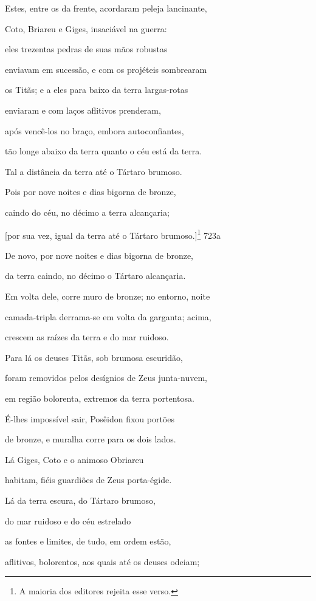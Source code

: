 \begin{pages}
\begin{Rightside}
Estes, entre os da frente, acordaram peleja lancinante,

Coto, Briareu e Giges, insaciável na guerra:

eles trezentas pedras de suas mãos robustas 

enviavam em sucessão, e com os projéteis sombrearam

os Titãs; e a eles para baixo da terra largas-rotas

enviaram e com laços aflitivos prenderam,

após vencê-los no braço, embora autoconfiantes,

tão longe abaixo da terra quanto o céu está da terra. 

\medskip

Tal a distância da terra até o Tártaro brumoso.

Pois por nove noites e dias bigorna de bronze,

caindo do céu, no décimo a terra alcançaria;

{[}por sua vez, igual da terra até o Tártaro brumoso.{]}\footnote{A maioria dos editores rejeita esse verso.} \num{723a}

De novo, por nove noites e dias bigorna de bronze,

da terra caindo, no décimo o Tártaro alcançaria. 

Em volta dele, corre muro de bronze; no entorno, noite

camada-tripla derrama-se em volta da garganta; acima,

crescem as raízes da terra e do mar ruidoso.

\quad{}Para lá os deuses Titãs, sob brumosa escuridão,

foram removidos pelos desígnios de Zeus junta-nuvem, 

em região bolorenta, extremos da terra portentosa.

É-lhes impossível sair, Posêidon fixou portões

de bronze, e muralha corre para os dois lados.

\quad{}Lá Giges, Coto e o animoso Obriareu

habitam, fiéis guardiões de Zeus porta-égide. 

\quad{}Lá da terra escura, do Tártaro brumoso,

do mar ruidoso e do céu estrelado

as fontes e limites, de tudo, em ordem estão,

aflitivos, bolorentos, aos quais até os deuses odeiam;


\end{Rightside}
\end{pages}
